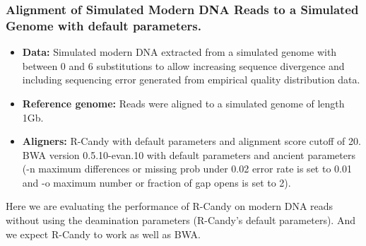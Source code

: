 \documentclass[11pt,a4paper]{report}
\begin{document}





\subsubsection {Alignment of Simulated Modern DNA Reads to a Simulated Genome 
with default parameters.}

\label {Alignment of Simulated Modern DNA Reads to a Simulated Genome with 
default parameters.}
 
 
 \begin{itemize}

   \item \textbf{Data:} Simulated modern DNA extracted from a simulated genome 
   with between 0 and 6 substitutions to allow increasing sequence divergence
   and including sequencing error generated from empirical quality distribution 
   data.
 
   
   \item \textbf{Reference genome:} Reads were aligned to a simulated genome of 
   length 1Gb.

    \item \textbf{Aligners:} 
     R-Candy with default parameters and alignment score cutoff of 20. \\
     BWA version 0.5.10-evan.10 with default parameters and ancient parameters 
     (-n maximum differences or missing prob under 0.02 error rate is set to 0.01 
     and -o maximum number or fraction of gap opens is set to 2)\cite{green2010draft}.

  \end{itemize}
 
Here we are evaluating the performance of R-Candy on modern DNA reads 
without using the deamination parameters (R-Candy's default parameters).
And we expect R-Candy to work as well as BWA.
\end{document}
